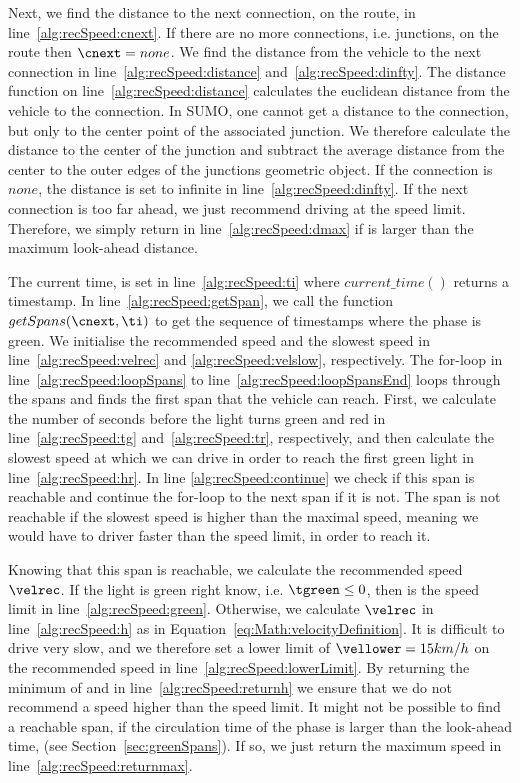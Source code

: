 Next, we find the distance to the next connection, \cnext on the route, \route in line~\ref{alg:recSpeed:cnext}. 
If there are no more connections, i.e. junctions, on the route then $\cnext=none$.
We find the distance from the vehicle to the next connection in line~\ref{alg:recSpeed:distance} and~\ref{alg:recSpeed:dinfty}.
The distance function on line~\ref{alg:recSpeed:distance} calculates the euclidean distance from the vehicle to the connection.
In SUMO, one cannot get a distance to the connection, but only to the center point of the associated junction.
We therefore calculate the distance to the center of the junction and subtract the average distance from the center to the outer edges of the junctions geometric object. %
If the connection is $none$, the distance is set to infinite in line~\ref{alg:recSpeed:dinfty}.
If the next connection is too far ahead, we just recommend driving at the speed limit. 
Therefore, we simply return \velmax in line~\ref{alg:recSpeed:dmax} if \dist is larger than the maximum look-ahead distance.

The current time, \ti is set in line~\ref{alg:recSpeed:ti} where $current\_time()$ returns a timestamp.
In line~\ref{alg:recSpeed:getSpan}, we call the function $getSpans(\cnext, \ti)$ to get the sequence of timestamps where the phase is green.
We initialise the recommended speed and the slowest speed in line~\ref{alg:recSpeed:velrec} and \ref{alg:recSpeed:velslow}, respectively.
The for-loop in line~\ref{alg:recSpeed:loopSpans} to line~\ref{alg:recSpeed:loopSpansEnd} loops through the spans and finds the first span that the vehicle can reach.
First, we calculate the number of seconds before the light turns green and red in line~\ref{alg:recSpeed:tg} and~\ref{alg:recSpeed:tr}, respectively, and then calculate the slowest speed at which we can drive in order to reach the first green light in line~\ref{alg:recSpeed:hr}.
In line \ref{alg:recSpeed:continue} we check if this span is reachable and continue the for-loop to the next span if it is not. 
The span is not reachable if the slowest speed is higher than the maximal speed, meaning we would have to driver faster than the speed limit, in order to reach it.

Knowing that this span is reachable, we calculate the recommended speed $\velrec$.
If the light is green right know, i.e. $\tgreen \leq 0$, then \velrec is the speed limit in line~\ref{alg:recSpeed:green}. 
Otherwise, we calculate $\velrec$ in line~\ref{alg:recSpeed:h} as in Equation~\ref{eq:Math:velocityDefinition}.
It is difficult to drive very slow, and we therefore set a lower limit of $\vellower=15km/h$ on the recommended speed in line~\ref{alg:recSpeed:lowerLimit}. 
By returning the minimum of \velrec and \velmax in line~\ref{alg:recSpeed:returnh} we ensure that we do not recommend a speed higher than the speed limit.
It might not be possible to find a reachable span, if the circulation time of the phase is larger than the look-ahead time, \tmax (see Section~\ref{sec:greenSpans}).
If so, we just return the maximum speed in line~\ref{alg:recSpeed:returnmax}.

